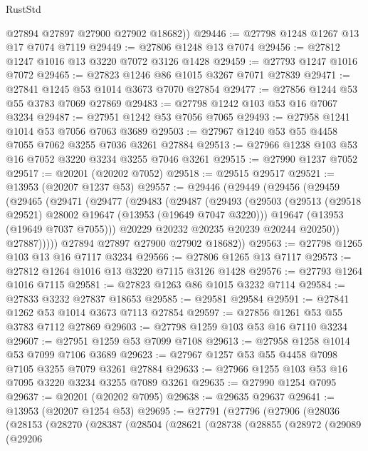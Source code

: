 \begin{lexlean}{RustStd}
\begin{coremodule}
        @27894
        @27897
        @27900
        @27902
        @18682))
@29446 := @27798 @1248 @1267 @13 @17 @7074 @7119
@29449 := @27806 @1248 @13 @7074
@29456 := @27812 @1247 @1016 @13 @3220 @7072 @3126 @1428
@29459 := @27793 @1247 @1016 @7072
@29465 := @27823 @1246 @86 @1015 @3267 @7071 @27839
@29471 := @27841 @1245 @53 @1014 @3673 @7070 @27854
@29477 := @27856 @1244 @53 @55 @3783 @7069 @27869
@29483 := @27798 @1242 @103 @53 @16 @7067 @3234
@29487 := @27951 @1242 @53 @7056 @7065
@29493 := @27958 @1241 @1014 @53 @7056 @7063 @3689
@29503 := @27967 @1240 @53 @55 @4458 @7055 @7062 @3255 @7036 @3261 @27884
@29513 := @27966 @1238 @103 @53 @16 @7052 @3220 @3234 @3255 @7046 @3261
@29515 := @27990 @1237 @7052
@29517 := @20201 (@20202 @7052)
@29518 := @29515 @29517
@29521 := @13953 (@20207 @1237 @53)
@29557 := @29446
    (@29449
      (@29456
        (@29459
          (@29465
            (@29471
              (@29477
                (@29483
                  (@29487
                    (@29493
                      (@29503
                        (@29513 (@29518 @29521) @28002 @19647 (@13953 (@19649 @7047 @3220)))
                        @19647
                        (@13953 (@19649 @7037 @7055)))
                      @20229
                      @20232
                      @20235
                      @20239
                      @20244
                      @20250))
                  @27887)))))
        @27894
        @27897
        @27900
        @27902
        @18682))
@29563 := @27798 @1265 @103 @13 @16 @7117 @3234
@29566 := @27806 @1265 @13 @7117
@29573 := @27812 @1264 @1016 @13 @3220 @7115 @3126 @1428
@29576 := @27793 @1264 @1016 @7115
@29581 := @27823 @1263 @86 @1015 @3232 @7114
@29584 := @27833 @3232 @27837 @18653
@29585 := @29581 @29584
@29591 := @27841 @1262 @53 @1014 @3673 @7113 @27854
@29597 := @27856 @1261 @53 @55 @3783 @7112 @27869
@29603 := @27798 @1259 @103 @53 @16 @7110 @3234
@29607 := @27951 @1259 @53 @7099 @7108
@29613 := @27958 @1258 @1014 @53 @7099 @7106 @3689
@29623 := @27967 @1257 @53 @55 @4458 @7098 @7105 @3255 @7079 @3261 @27884
@29633 := @27966 @1255 @103 @53 @16 @7095 @3220 @3234 @3255 @7089 @3261
@29635 := @27990 @1254 @7095
@29637 := @20201 (@20202 @7095)
@29638 := @29635 @29637
@29641 := @13953 (@20207 @1254 @53)
@29695 := @27791
    (@27796
      (@27906
        (@28036
          (@28153
            (@28270
              (@28387
                (@28504
                  (@28621
                    (@28738
                      (@28855
                        (@28972
                          (@29089
                            (@29206

\end{coremodule}
\end{lexlean}
